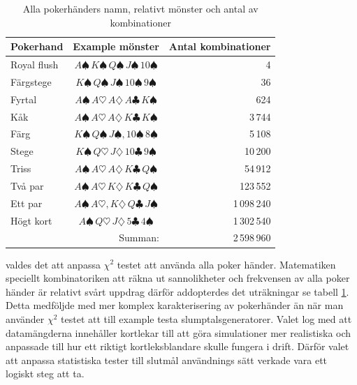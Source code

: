 \documentclass[swedish,a4paper]{article}
\begin{document}
\begin{table}[ht] 
\captionsetup{justification=centering,margin=4cm}
\caption{Alla pokerhänders namn, relativt mönster och antal av kombinationer }
\label{tab:all_poker_hands}
	\centering
	\begin{tabular}{|l|c|r|}
	
	\hline 
	Pokerhand 
	& Example mönster 
	& Antal kombinationer 
	\\ \hline  

	Royal flush 
	& $A\spadesuit\, K\spadesuit\, Q\spadesuit\, J\spadesuit\, 10\spadesuit$
	& 4 
	\\ \hline

	Färgstege
	& $K\spadesuit\, Q\spadesuit\, J\spadesuit\, 10\spadesuit\, 9\spadesuit$
	& 36 
	\\ \hline

	Fyrtal 
	& $A\spadesuit\,A\heartsuit\,A\diamondsuit\,A\clubsuit\, K\spadesuit$ 
	& 624 
	\\ \hline

	Kåk 
	& $A\spadesuit\, A\heartsuit\, A\diamondsuit\, K\clubsuit\,K\spadesuit$ 
	& 3\,744
	\\ \hline

	Färg
	& $K\spadesuit\, Q\spadesuit\, J\spadesuit, 10\spadesuit\, 8\spadesuit$
	& 5\,108
	\\ \hline

	Stege 
	& $K\spadesuit\, Q\heartsuit\, J\diamondsuit\, 10\clubsuit\,9\spadesuit$ 
	& 10\,200
	\\ \hline
	Triss 
	& $A\spadesuit\, A\heartsuit\, A\diamondsuit\, K\clubsuit\, Q\spadesuit$
	& 54\,912
	\\ \hline

	Två par 
	& $A\spadesuit\, A\heartsuit\, K\diamondsuit\, K\clubsuit\, Q\spadesuit$
	& 123\,552
	\\ \hline

	Ett par 
	& $A\spadesuit\, A\heartsuit, K\diamondsuit\, Q\clubsuit\, J\spadesuit$ 
	& 1\,098\,240 
	\\ \hline

	Högt kort
	& $A\spadesuit\, Q\heartsuit\, J\diamondsuit\, 5\clubsuit\, 4\spadesuit$
	& 1\,302\,540
	\\ \hline

	 
	\multicolumn{2}{|r|}{Summan:} 
	& 2\,598\,960 
	\\ \hline
\end{tabular}
\end{table}

valdes det att anpassa $\chi^2$ testet att använda alla poker händer. Matematiken
speciellt kombinatoriken att räkna ut sannolikheter och frekvensen av alla poker\-
händer är relativt svårt uppdrag därför addopterdes det \textcite{Drew2006} 
uträkningar se tabell \ref{tab:all_poker_hands}. Detta medföljde med mer komplex
karakterisering av poker\-händer än när man använder $\chi^2$ testet 
att till example testa slumptalsgeneratorer. Valet log med att datamängderna 
innehåller kortlekar till att göra simulationer mer  realistiska och anpassade
till hur ett riktigt kortleksblandare skulle fungera i drift. Därför valet att
anpassa statistiska tester till slutmål användnings sätt verkade vara ett
logiskt steg att ta.
\end{document}
